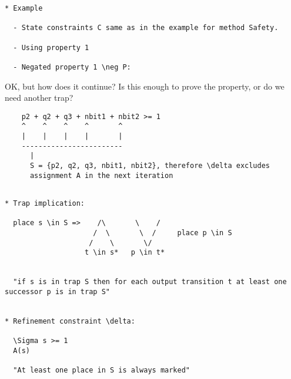 \newpage

\begin{verbatim}
* Example

  - State constraints C same as in the example for method Safety.
  
  - Using property 1
  
  - Negated property 1 \neg P:
\end{verbatim}


{\Large OK, but how does it continue? Is this enough to prove the property,
or do we need another trap?}

\begin{verbatim}
    p2 + q2 + q3 + nbit1 + nbit2 >= 1
    ^    ^    ^    ^       ^
    |    |    |    |       |
    ------------------------
      |
      S = {p2, q2, q3, nbit1, nbit2}, therefore \delta excludes
      assignment A in the next iteration
\end{verbatim}

\newpage

\begin{verbatim}

* Trap implication:

  place s \in S =>    /\       \    /
                     /  \       \  /     place p \in S
                    /    \       \/
                   t \in s*   p \in t*   


  "if s is in trap S then for each output transition t at least one successor p is in trap S"


* Refinement constraint \delta:

  \Sigma s >= 1  
  A(s)

  "At least one place in S is always marked"
\end{verbatim}
\fi

